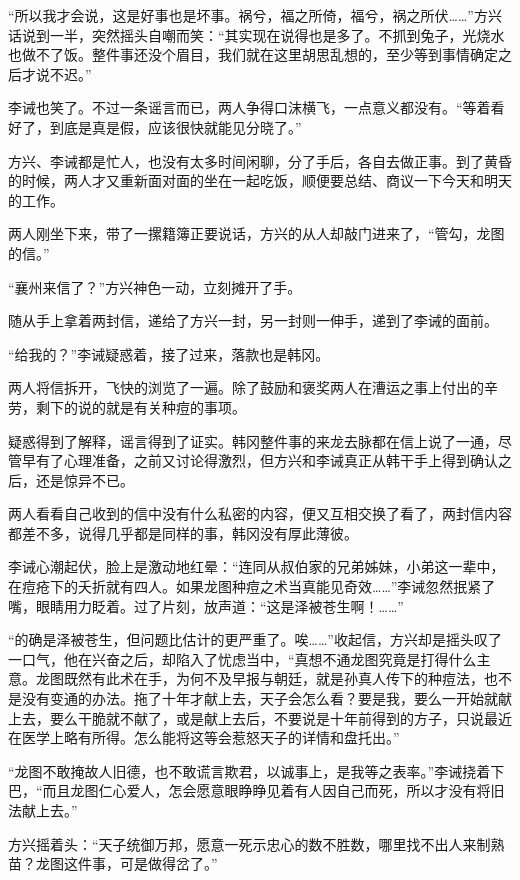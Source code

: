 “所以我才会说，这是好事也是坏事。祸兮，福之所倚，福兮，祸之所伏……”方兴话说到一半，突然摇头自嘲而笑：“其实现在说得也是多了。不抓到兔子，光烧水也做不了饭。整件事还没个眉目，我们就在这里胡思乱想的，至少等到事情确定之后才说不迟。”

李诫也笑了。不过一条谣言而已，两人争得口沫横飞，一点意义都没有。“等着看好了，到底是真是假，应该很快就能见分晓了。”

方兴、李诫都是忙人，也没有太多时间闲聊，分了手后，各自去做正事。到了黄昏的时候，两人才又重新面对面的坐在一起吃饭，顺便要总结、商议一下今天和明天的工作。

两人刚坐下来，带了一摞籍簿正要说话，方兴的从人却敲门进来了，“管勾，龙图的信。”

“襄州来信了？”方兴神色一动，立刻摊开了手。

随从手上拿着两封信，递给了方兴一封，另一封则一伸手，递到了李诫的面前。

“给我的？”李诫疑惑着，接了过来，落款也是韩冈。

两人将信拆开，飞快的浏览了一遍。除了鼓励和褒奖两人在漕运之事上付出的辛劳，剩下的说的就是有关种痘的事项。

疑惑得到了解释，谣言得到了证实。韩冈整件事的来龙去脉都在信上说了一通，尽管早有了心理准备，之前又讨论得激烈，但方兴和李诫真正从韩干手上得到确认之后，还是惊异不已。

两人看看自己收到的信中没有什么私密的内容，便又互相交换了看了，两封信内容都差不多，说得几乎都是同样的事，韩冈没有厚此薄彼。

李诫心潮起伏，脸上是激动地红晕：“连同从叔伯家的兄弟姊妹，小弟这一辈中，在痘疮下的夭折就有四人。如果龙图种痘之术当真能见奇效……”李诫忽然抿紧了嘴，眼睛用力眨着。过了片刻，放声道：“这是泽被苍生啊！……”

“的确是泽被苍生，但问题比估计的更严重了。唉……”收起信，方兴却是摇头叹了一口气，他在兴奋之后，却陷入了忧虑当中，“真想不通龙图究竟是打得什么主意。龙图既然有此术在手，为何不及早报与朝廷，就是孙真人传下的种痘法，也不是没有变通的办法。拖了十年才献上去，天子会怎么看？要是我，要么一开始就献上去，要么干脆就不献了，或是献上去后，不要说是十年前得到的方子，只说最近在医学上略有所得。怎么能将这等会惹怒天子的详情和盘托出。”

“龙图不敢掩故人旧德，也不敢谎言欺君，以诚事上，是我等之表率。”李诫挠着下巴，“而且龙图仁心爱人，怎会愿意眼睁睁见着有人因自己而死，所以才没有将旧法献上去。”

方兴摇着头：“天子统御万邦，愿意一死示忠心的数不胜数，哪里找不出人来制熟苗？龙图这件事，可是做得岔了。”

